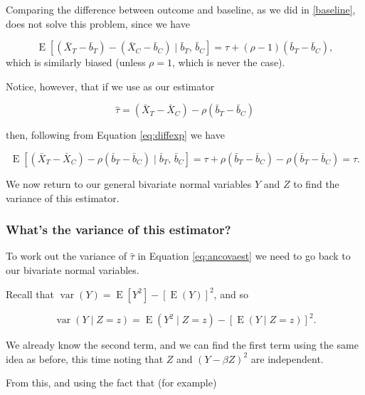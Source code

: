 \documentclass[
  openany]{book}
\theoremstyle{definition}
\theoremstyle{definition}
\theoremstyle{definition}
\theoremstyle{definition}
\theoremstyle{remark}
\begin{document}
Comparing the difference between outcome and baseline, as we did in \ref{baseline}, does not solve this problem, since we have

\[\operatorname{E}\left[\left(\bar{X}_T - \bar{b}_T\right) - \left(\bar{X}_C - \bar{b}_C\right)\mid{\bar{b}_T,\,\bar{b}_C}\right] = \tau + \left(\rho-1\right)\left(\bar{b}_T - \bar{b}_C\right),\]
which is similarly biased (unless \(\rho=1\), which is never the case).

Notice, however, that if we use as our estimator

\begin{equation}
\hat{\tau} = \left(\bar{X}_T - \bar{X}_C\right) - \rho \left(\bar{b}_T - \bar{b}_C\right)
\label{eq:ancovaest}
\end{equation}

then, following from Equation \eqref{eq:diffexp} we have

\[
\operatorname{E}\left[\left(\bar{X}_T - \bar{X}_C\right) - \rho \left(\bar{b}_T - \bar{b}_C\right)\mid{\bar{b}_T,\,\bar{b}_C}\right] = \tau + \rho\left(\bar{b}_T - \bar{b}_C\right)- \rho\left(\bar{b}_T - \bar{b}_C\right) = \tau. \]

We now return to our general bivariate normal variables \(Y\) and \(Z\) to find the variance of this estimator.

\subsubsection{What's the variance of this estimator?}\label{ancova-var}

To work out the variance of \(\hat{\tau}\) in Equation \eqref{eq:ancovaest} we need to go back to our bivariate normal variables.

Recall that \(\operatorname{var}\left(Y\right) = \operatorname{E}\left[Y^2\right] - \left[\operatorname{E}\left(Y\right)\right]^2\), and so

\begin{equation}
\operatorname{var}\left(Y\mid{Z=z}\right) = \operatorname{E}\left(Y^2\mid{Z=z}\right) - \left[\operatorname{E}\left(Y\mid{Z=z}\right)\right]^2. 
\label{eq:vary2}
\end{equation}

We already know the second term, and we can find the first term using the same idea as before, this time noting that \(Z\) and \(\left(Y-\beta Z\right)^2\) are independent.

From this, and using the fact that (for example)
\end{document}
